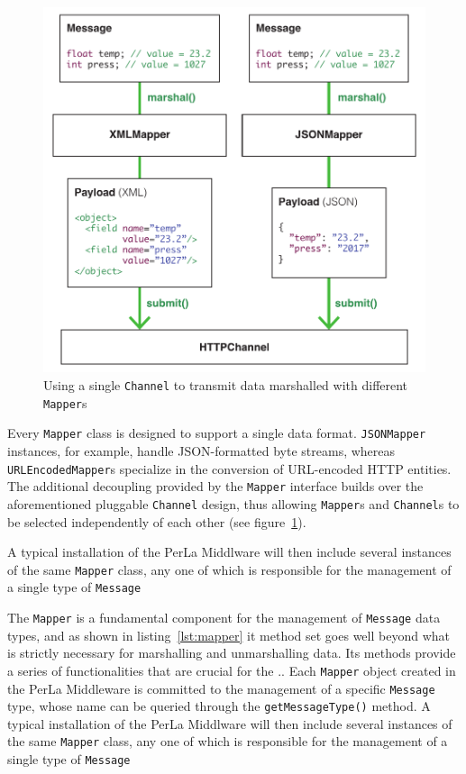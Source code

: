 \begin{figure}[h!]
    \centering
    \includegraphics[scale=0.8]{imgs/mapper_channel.pdf}
    \caption{Using a single \texttt{Channel} to transmit data marshalled with
    different \texttt{Mapper}s}
    \label{fig:mapper_channel}
\end{figure}

Every \texttt{Mapper} class is designed to support a single data format. 
\texttt{JSONMapper} instances, for example, handle JSON-formatted byte
streams, whereas \texttt{URLEncodedMapper}s specialize in the conversion of
URL-encoded HTTP entities. The additional decoupling provided by the
\texttt{Mapper} interface builds over the aforementioned pluggable
\texttt{Channel} design, thus allowing \texttt{Mapper}s and \texttt{Channel}s
to be selected independently of each other (see
figure~\ref{fig:mapper_channel}).










A typical installation of the PerLa Middlware
will then include several instances of the same \texttt{Mapper} class, any one
of which is responsible for the management of a single type of \texttt{Message}

The \texttt{Mapper} is a fundamental component for the management of
\texttt{Message} data types, and as shown in listing~\ref{lst:mapper} it method
set goes well beyond what is strictly necessary for marshalling and
unmarshalling data. Its methods provide a series of functionalities that are
crucial for the .. Each \texttt{Mapper} object created in the PerLa Middleware
is committed to the management of a specific \texttt{Message} type, whose name
can be queried through the \texttt{getMessageType()} method. A typical
installation of the PerLa Middlware will then include several instances of the
same \texttt{Mapper} class, any one of which is responsible for the management
of a single type of \texttt{Message}

